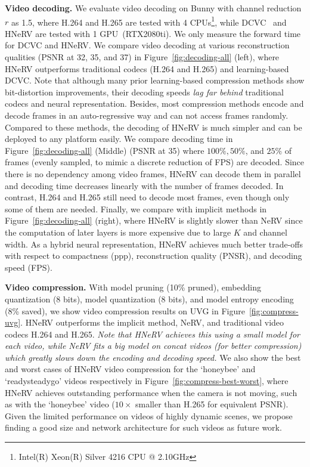 \documentclass[10pt,twocolumn,letterpaper]{article}
\begin{document}
\noindent\textbf{Video decoding.}
We evaluate video decoding on Bunny with channel reduction $r$ as 1.5, where H.264 and H.265 are tested with 4 CPUs\footnote{Intel(R) Xeon(R) Silver 4216 CPU @ 2.10GHz}, while DCVC~\cite{li2021dcvc} and HNeRV are tested with 1 GPU~(RTX2080ti).
We only measure the forward time for DCVC and HNeRV.
We compare video decoding at various reconstruction qualities (PSNR at  32, 35, and 37) in Figure~\ref{fig:decoding-all} (left), where HNeRV outperforms traditional codecs (H.264 and H.265) and learning-based DCVC.
Note that although many prior learning-based compression methods show bit-distortion improvements, their decoding speeds \textit{lag far behind} traditional codecs and neural representation.
Besides, most compression methods encode and decode frames in an auto-regressive way and can not access frames randomly.
Compared to these methods, the decoding of HNeRV is much simpler and can be deployed to any platform easily.
We compare decoding time in Figure~\ref{fig:decoding-all} (Middle) (PSNR at 35) where $100\%, 50\%$, and $25\%$ of frames (evenly sampled, to mimic \eg a discrete reduction of FPS) are decoded.
Since there is no dependency among video frames, HNeRV can decode them in parallel and decoding time decreases linearly with the number of frames decoded.
In contrast, H.264 and H.265 still need to decode most frames, even though only some of them are needed.
Finally, we compare with implicit methods in Figure~\ref{fig:decoding-all} (right), where HNeRV is slightly slower than NeRV since the computation of later layers is more expensive due to large $K$ and channel width.
As a hybrid neural representation, HNeRV achieves much better trade-offs with respect to compactness (ppp), reconstruction quality (PNSR), and decoding speed (FPS).


\noindent\textbf{Video compression.}
With model pruning (10\% pruned), embedding quantization (8 bits), model quantization (8 bits), and model entropy encoding (8\% saved), we show video compression results on UVG in Figure~\ref{fig:compress-uvg}.
HNeRV outperforms the implicit method, NeRV, and traditional video codecs H.264 and H.265.
\textit{Note that HNeRV achieves this using a small model for each video, while NeRV fits a big model on concat videos (for better compression) which greatly slows down the encoding and decoding speed.}
We also show the best and worst cases of HNeRV video compression for the `honeybee' and `readysteadygo' videos respectively in Figure~\ref{fig:compress-best-worst}, where HNeRV achieves outstanding performance when the camera is not moving, such as with the `honeybee' video ($10\times$ smaller than H.265 for equivalent PSNR).
Given the limited performance on videos of highly dynamic scenes, we propose finding a good size and network architecture for such videos as future work.
\end{document}
